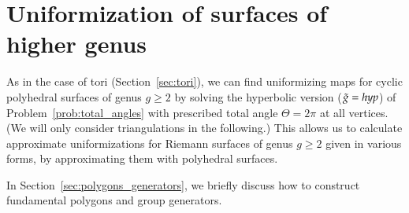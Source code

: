 \documentclass[Thesis]{subfiles}
\begin{document}
\section{Uniformization of surfaces of higher genus}
\label{sec:higher_genus}

As in the case of tori (Section~\ref{sec:tori}), we can find
uniformizing maps for cyclic polyhedral surfaces of genus $g\geq 2$ by
solving the hyperbolic version ($\tilde{g}=\mathit{hyp}$) of
Problem~\ref{prob:total_angles} with prescribed total angle
$\Theta=2\pi$ at all vertices. (We will only consider
triangulations in the following.)  This allows us to calculate approximate
uniformizations for Riemann surfaces of genus $g\geq 2$ given in
various forms, by approximating them with polyhedral surfaces. 

In Section~\ref{sec:polygons_generators}, we briefly discuss how to
construct fundamental polygons and group generators.
\end{document}
